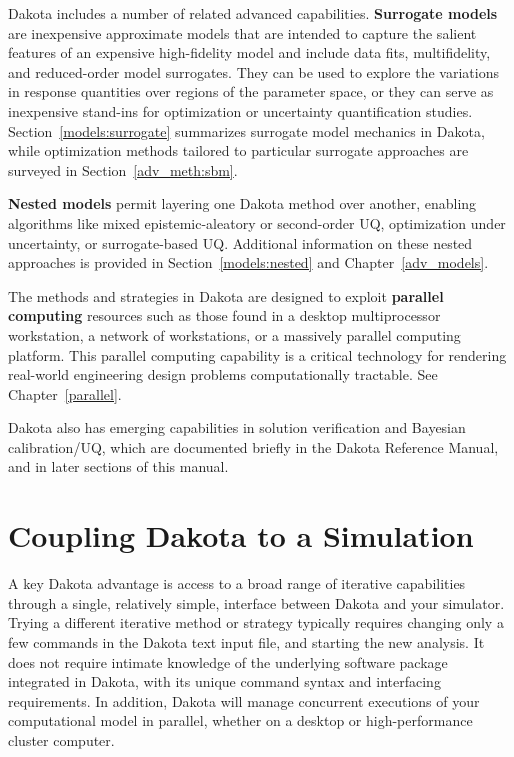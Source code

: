 Dakota includes a number of related advanced capabilities. {\bf
  Surrogate models} are inexpensive approximate models that are
intended to capture the salient features of an expensive high-fidelity
model and include data fits, multifidelity, and reduced-order model
surrogates. They can be used to explore the variations in response
quantities over regions of the parameter space, or they can serve as
inexpensive stand-ins for optimization or uncertainty quantification
studies. Section~\ref{models:surrogate} summarizes surrogate model
mechanics in Dakota, while optimization methods tailored to particular
surrogate approaches are surveyed in Section~\ref{adv_meth:sbm}.

{\bf Nested models} permit layering one Dakota method over another,
enabling algorithms like mixed epistemic-aleatory or second-order UQ,
optimization under uncertainty, or surrogate-based UQ. Additional
information on these nested approaches is provided in
Section~\ref{models:nested} and Chapter~\ref{adv_models}.

The methods and strategies in Dakota are designed to exploit {\bf
  parallel computing} resources such as those found in a desktop
multiprocessor workstation, a network of workstations, or a massively
parallel computing platform. This parallel computing capability is a
critical technology for rendering real-world engineering design
problems computationally tractable. See Chapter~\ref{parallel}.

Dakota also has emerging capabilities in solution verification and
Bayesian calibration/UQ, which are documented briefly in the Dakota
Reference Manual, and in later sections of this manual.

\section{Coupling Dakota to a Simulation}\label{intro:coupling}

A key Dakota advantage is access to a broad range of iterative
capabilities through a single, relatively simple, interface between
Dakota and your simulator. Trying a different iterative method or
strategy typically requires changing only a few commands in the Dakota
text input file, and starting the new analysis. It does not require
intimate knowledge of the underlying software package integrated in
Dakota, with its unique command syntax and interfacing requirements.
In addition, Dakota will manage concurrent executions of your
computational model in parallel, whether on a desktop or
high-performance cluster computer.

